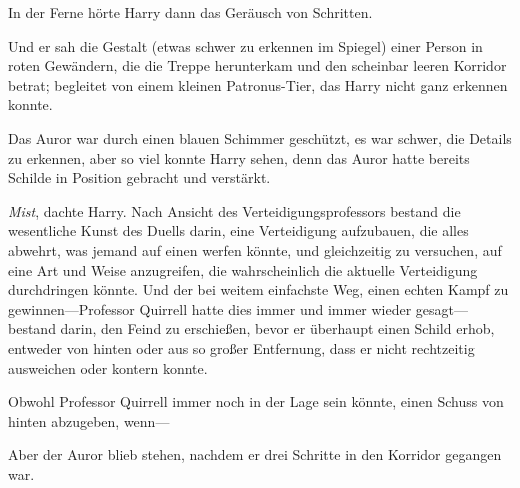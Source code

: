 In der Ferne hörte Harry dann das Geräusch von Schritten.

Und er sah die Gestalt (etwas schwer zu erkennen im Spiegel) einer Person in roten Gewändern, die die Treppe herunterkam und den scheinbar leeren Korridor betrat; begleitet von einem kleinen Patronus-Tier, das Harry nicht ganz erkennen konnte.

Das Auror war durch einen blauen Schimmer geschützt, es war schwer, die Details zu erkennen, aber so viel konnte Harry sehen, denn das Auror hatte bereits Schilde in Position gebracht und verstärkt.

\emph{Mist}, dachte Harry. Nach Ansicht des Verteidigungsprofessors bestand die wesentliche Kunst des Duells darin, eine Verteidigung aufzubauen, die alles abwehrt, was jemand auf einen werfen könnte, und gleichzeitig zu versuchen, auf eine Art und Weise anzugreifen, die wahrscheinlich die aktuelle Verteidigung durchdringen könnte. Und der bei weitem einfachste Weg, einen echten Kampf zu gewinnen—Professor Quirrell hatte dies immer und immer wieder gesagt—bestand darin, den Feind zu erschießen, bevor er überhaupt einen Schild erhob, entweder von hinten oder aus so großer Entfernung, dass er nicht rechtzeitig ausweichen oder kontern konnte.

Obwohl Professor Quirrell immer noch in der Lage sein könnte, einen Schuss von hinten abzugeben, wenn—

Aber der Auror blieb stehen, nachdem er drei Schritte in den Korridor gegangen war.

